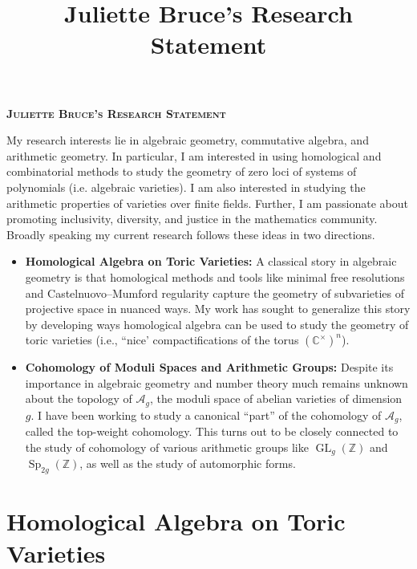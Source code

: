 \documentclass[11pt,reqno]{amsart}
\title{Juliette Bruce's Research Statement}
\theoremstyle{remark}
\newcommand{\GL}{{\operatorname{GL}}}
\newcommand{\Sp}{\operatorname{Sp}}
\newcommand{\cA}{\mathcal{A}}
\newcommand{\C}{\mathbb{C}}
\newcommand{\Z}{\mathbb{Z}}
\begin{document}
 

\begingroup  
  \centering
  \large\scshape\bfseries Juliette Bruce's Research Statement\\[1em]
\endgroup


\setcounter{section}{0}

My research interests lie in algebraic geometry, commutative algebra, and arithmetic geometry. In particular, I am interested in using homological and combinatorial methods to study the geometry of zero loci of systems of polynomials (i.e. algebraic varieties). I am also interested in studying the arithmetic properties of varieties over finite fields. Further, I am passionate about promoting inclusivity, diversity, and justice in the mathematics community. Broadly speaking my current research follows these ideas in two directions. 

\begin{itemize}[leftmargin=*]
\item \textbf{Homological Algebra on Toric Varieties:} A classical story in algebraic geometry is that homological methods and tools like minimal free resolutions and Castelnuovo--Mumford  regularity capture the geometry of subvarieties of projective space in nuanced ways. My work has sought to generalize this story by developing ways homological algebra can be used to study the geometry of toric varieties (i.e., ``nice' compactifications of the torus $(\C^{\times})^{n}$). 

\item \textbf{Cohomology of Moduli Spaces and Arithmetic Groups:} Despite its importance in algebraic geometry and number theory much remains unknown about the topology of $\cA_{g}$, the moduli space of abelian varieties of dimension $g$. I have been working to study a canonical ``part'' of the cohomology of $\mathcal{A}_{g}$, called the top-weight cohomology. This turns out to be closely connected to the study of cohomology of various arithmetic groups like $\GL_{g}(\Z)$ and $\Sp_{2g}(\Z)$, as well as the study of automorphic forms. 

\end{itemize}

\section{Homological Algebra on Toric Varieties}
\end{document}
